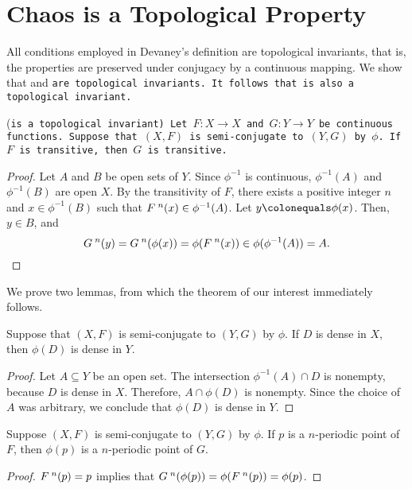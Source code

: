 \documentclass[10pt,draft,twoside]{book}
\begin{document}
\section{Chaos is a Topological Property}
All conditions employed in Devaney's definition are topological invariants, that is, the properties are preserved under conjugacy by a continuous mapping.
We show that \dpp and \tt are topological invariants.
It follows that \sdic is also a topological invariant.
\begin{proposition}
  (\tt is a topological invariant) 
  Let $F: X \to X$ and $G: Y \to Y$ be continuous functions.
  Suppose that $(X,F)$ is semi-conjugate to $(Y,G)$ by $\phi$.
  If $F$ is transitive, then $G$ is transitive.
  \label{prop:conj-trans}
  \begin{proof}
    Let $A$ and $B$ be open sets of $Y$.
    Since $\phi^{-1}$ is continuous, $\phi^{-1}(A)$ and $\phi^{-1}(B)$ are open $X$.
    By the transitivity of $F$, there exists a positive integer $n$ and $x \in \phi^{-1}(B)$ such that $F^{\;n}(x)\in \phi^{-1}(A)$.
    Let $y \ceq \phi(x)$.
    Then, $y \in B$, and 
    \begin{equation*}
      G^{\;n}(y) 
      = G^{\;n}(\phi(x))
      = \phi(F^{\;n}(x)) \in \phi(\phi^{-1}(A)) = A.
    \end{equation*}
  \end{proof}
\end{proposition}
We prove two lemmas, from which the theorem of our interest immediately follows.
\begin{lemma}
  Suppose that $(X,F)$ is semi-conjugate to $(Y,G)$ by $\phi$.
  If $D$ is dense in $X$, then $\phi(D)$ is dense in $Y$.
  \label{lem:conj-dense}
  \begin{proof}
    Let $A \subseteq Y$ be an open set.
    The intersection $\phi^{-1} (A) \cap D$ is nonempty, because $D$ is dense in $X$.
    Therefore, $A \cap \phi(D)$ is nonempty.
    Since the choice of $A$ was arbitrary, we conclude that $\phi(D)$ is dense in $Y$.
  \end{proof}
\end{lemma}
\begin{lemma}
  Suppose $(X,F)$ is semi-conjugate to $(Y,G)$ by $\phi$.
  If $p$ is a $n$-periodic point of $F$, then $\phi(p)$ is a $n$-periodic point of $G$.
  \label{lem:conj-per}
  \begin{proof}
    $F^{\;n}(p) = p$ implies that $G^{\;n}(\phi(p)) = \phi(F^{\;n}(p)) = \phi(p)$.
  \end{proof}
\end{lemma}
\end{document}
